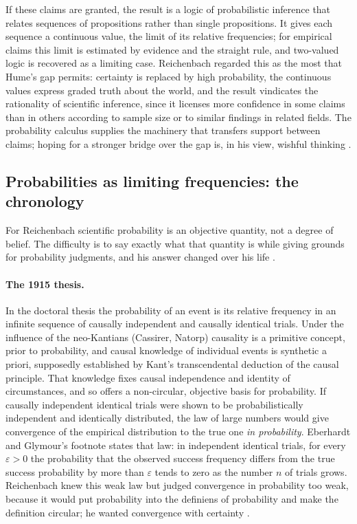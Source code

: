 If these claims are granted, the result is a logic of probabilistic
inference that relates sequences of propositions rather than single
propositions. It gives each sequence a continuous value, the limit of
its relative frequencies; for empirical claims this limit is estimated
by evidence and the straight rule, and two-valued logic is recovered as
a limiting case. Reichenbach regarded this as the most that Hume's gap
permits: certainty is replaced by high probability, the continuous
values express graded truth about the world, and the result vindicates
the rationality of scientific inference, since it licenses more
confidence in some claims than in others according to sample size or to
similar findings in related fields. The probability calculus supplies
the machinery that transfers support between claims; hoping for a
stronger bridge over the gap is, in his view, wishful thinking
\cite[p.~362]{EberhardtGlymour2011ReichenbachReading}.

\subsection{Probabilities as limiting frequencies: the chronology}
\label{sec:p15-w02b-p15-030-eg-frequency}

For Reichenbach scientific probability is an objective quantity, not a
degree of belief. The difficulty is to say exactly what that quantity
is while giving grounds for probability judgments, and his answer
changed over his life \cite[p.~363]{EberhardtGlymour2011ReichenbachReading}.

\paragraph{The 1915 thesis.} In the doctoral thesis the probability of
an event is its relative frequency in an infinite sequence of causally
independent and causally identical trials. Under the influence of the
neo-Kantians (Cassirer, Natorp) causality is a primitive concept, prior
to probability, and causal knowledge of individual events is synthetic a
priori, supposedly established by Kant's transcendental deduction of the
causal principle. That knowledge fixes causal independence and identity
of circumstances, and so offers a non-circular, objective basis for
probability. If causally independent identical trials were shown to be
probabilistically independent and identically distributed, the law of
large numbers would give convergence of the empirical distribution to
the true one \emph{in probability}. Eberhardt and Glymour's footnote states that law:
in independent identical trials, for every \(\varepsilon>0\) the
probability that the observed success frequency differs from the true
success probability by more than \(\varepsilon\) tends to zero as the
number \(n\) of trials grows. Reichenbach knew this weak law but judged
convergence in probability too weak, because it would put probability
into the definiens of probability and make the definition circular; he
wanted convergence with certainty
\cite[p.~363 and n.~1]{EberhardtGlymour2011ReichenbachReading}.

